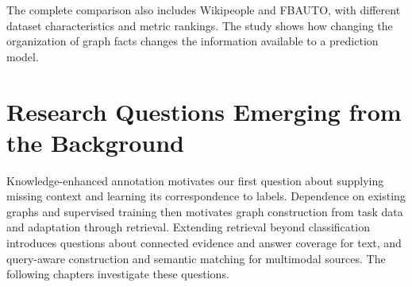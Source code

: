 The complete comparison also includes Wikipeople and FBAUTO, with different dataset characteristics and metric rankings. The study shows how changing the organization of graph facts changes the information available to a prediction model.

\section{Research Questions Emerging from the Background}
\label{sec:background:questions}

Knowledge-enhanced annotation motivates our first question about supplying missing context and learning its correspondence to labels. Dependence on existing graphs and supervised training then motivates graph construction from task data and adaptation through retrieval. Extending retrieval beyond classification introduces questions about connected evidence and answer coverage for text, and query-aware construction and semantic matching for multimodal sources. The following chapters investigate these questions.
